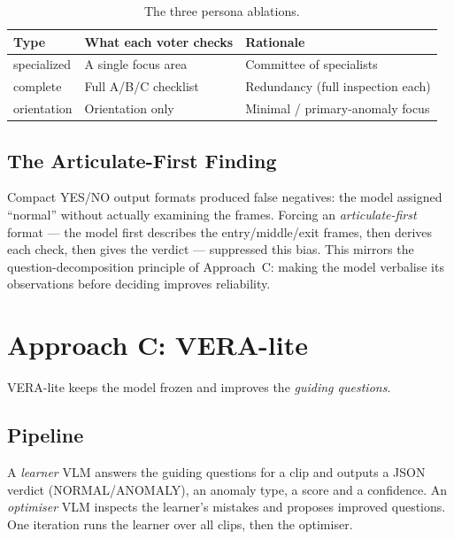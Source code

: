\begin{table}[!htbp]
\centering
\caption{\label{tab:persona-types}The three persona ablations.}
\begin{tabular}{l|l|l}
\hline
Type & What each voter checks & Rationale \\
\hline
specialized & A single focus area & Committee of specialists \\
complete    & Full A/B/C checklist & Redundancy (full inspection each) \\
orientation & Orientation only     & Minimal / primary-anomaly focus \\
\hline
\end{tabular}
\end{table}

\subsection{The Articulate-First Finding}
Compact YES/NO output formats produced false negatives: the model assigned ``normal''
without actually examining the frames. Forcing an \emph{articulate-first} format --- the
model first describes the entry/middle/exit frames, then derives each check, then gives
the verdict --- suppressed this bias. This mirrors the question-decomposition principle
of Approach~C: making the model verbalise its observations before deciding improves
reliability.

\section{Approach C: VERA-lite}
\label{sec:vera}
VERA-lite keeps the model frozen and improves the \emph{guiding questions}.

\subsection{Pipeline}
A \emph{learner} VLM answers the guiding questions for a clip and outputs a JSON verdict
(NORMAL/ANOMALY), an anomaly type, a score and a confidence. An \emph{optimiser} VLM
inspects the learner's mistakes and proposes improved questions. One iteration runs the
learner over all clips, then the optimiser.

